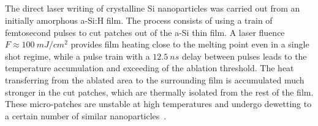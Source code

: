     \subsection{}
            The direct laser writing of crystalline Si nanoparticles was carried out from an initially amorphous a-Si:H film.
        The process consists of using a train of femtosecond pulses to cut patches out of the a-Si thin film\cite{makarov2016controllable,
        dmitriev2016direct}. A laser fluence $F\approx100~\si{mJ/cm^{2}}$ provides film heating close to the melting point even in a
        single shot regime, while a pulse train with a $12.5~\si{ns}$ delay between pulses leads to the temperature accumulation
        and exceeding of the ablation threshold. The heat transferring from the ablated area to the surrounding film is accumulated
        much stronger in the cut patches, which are thermally isolated from the rest of the film.
        These micro-patches are unstable at high temperatures and undergo dewetting to a certain number of similar
        nanoparticles~\cite{thompson2012solid}.


\clearpage
